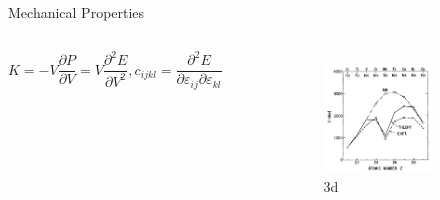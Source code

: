 \documentclass[aspectratio=169]{beamer}
\begin{document}
\begin{frame}{Mechanical Properties}
\begin{columns}
\begin{equation*}
K = -V\frac{\partial P}{\partial V} = V \frac{\partial^2 E}{\partial V^2}, c_{ijkl} = \frac{\partial^2 E}{\partial \varepsilon_{ij}\partial \varepsilon_{kl}}
\end{equation*}
\begin{figure}
    \centering
    \begin{subfigure}{0.45\textwidth}
        \centering
        \includegraphics[width=\linewidth]{lectures/figures/8_3D_TM_Bulk_Moduli.png}
    \caption{3d}
    \end{subfigure}
    \begin{subfigure}{0.45\textwidth}
        \centering

\end{subfigure}
\end{figure}
\end{columns}
\end{frame}
\end{document}

